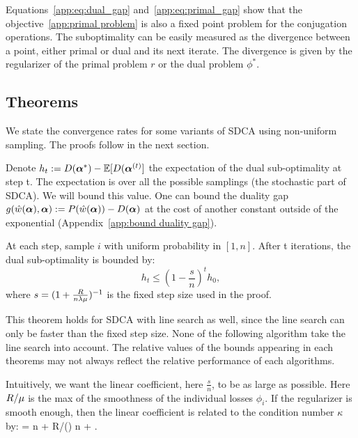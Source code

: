 \begin{subappendices}
	Equations~\eqref{app:eq:dual_gap} and~\eqref{app:eq:primal_gap} show that the objective~\eqref{app:primal problem} is also a fixed point problem for the conjugation operations.
	The suboptimality can be easily measured as the divergence between a point, either primal or dual and its next iterate.
	The divergence is given by the regularizer of the primal problem $r$ or the dual problem $\phi^*$.

	\subsection{Theorems}
	\label{app:theorem}

	We state the convergence rates for some variants of SDCA using non-uniform sampling. The proofs follow in the next section.

	Denote $h_t := D(\boldsymbol{\alpha}^*) - \operatorname{\mathbb{E}}[D(\boldsymbol{\alpha}^{(t)} ]$ the expectation of the dual sub-optimality at step t.
	The expectation is over all the possible samplings (the stochastic part of SDCA).
	We will bound this value.
	One can bound the duality gap $g(\hat w(\boldsymbol{\alpha}),\boldsymbol{\alpha}) := P(\hat w(\boldsymbol{\alpha})) - D(\boldsymbol{\alpha})$ at the cost of another constant outside of the exponential (Appendix~\ref{app:bound duality gap}).

	\begin{theorem}
		\label{app:th:uniform}
		At each step, sample $i$ with uniform probability in $[1,n]$.
		After t iterations, the dual sub-optimality is bounded by:
		\begin{equation}
			h_t \leq (1-\frac{s}{n})^t  h_0,
		\end{equation}
		where $ s = (1+ \frac{R}{n \lambda \mu} )^{-1} $ is the fixed step size used in the proof.
	\end{theorem}

	This theorem holds for SDCA with line search as well, since the line search can only be faster than the fixed step size.
	None of the following algorithm take the line search into account.
	The relative values of the bounds appearing in each theorems may not always reflect the relative
	performance of each algorithms.

	Intuitively, we want the linear coefficient, here $\frac{s}{n}$, to be as large as possible.
	Here $R/\mu$ is the max of the smoothness of the individual losses $\phi_i$.
	If the regularizer is smooth enough, then the linear coefficient is related to the condition number $\kappa$ by:
	\beq
	  = n + R/(\lambda \strgconvex) \approx n + \kappa.
	\eeq


\end{subappendices}
